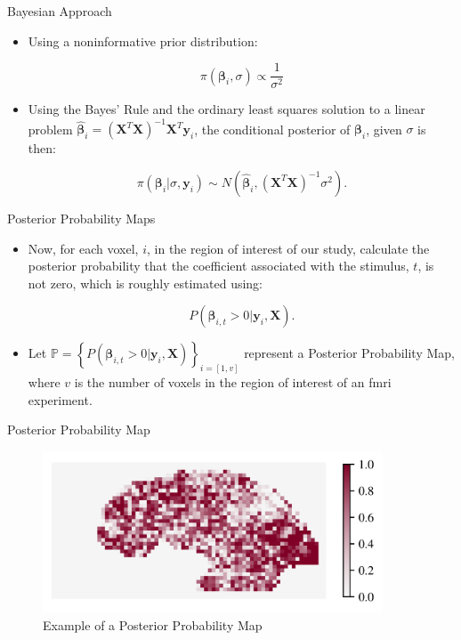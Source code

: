 \documentclass{beamer}
\begin{document}
\begin{frame}{Bayesian Approach}
\begin{itemize}
\item Using a noninformative prior distribution:

$$\pi \left( \bm{\beta}_i, \sigma \right) \propto \frac{1}{\sigma^{2}}$$

\item Using the Bayes' Rule and the ordinary least squares solution to a linear problem 
$\bm{\hat{\beta}}_i = \left( \bm{X}^T\bm{X} \right)^{-1}\bm{X}^T \bm{y}_i$, the 
conditional posterior of $\bm{\beta}_i$, given $\sigma$ is then:

$$\pi \left( \bm{\beta}_i|\sigma ,\bm{y}_i \right) \sim N\left( \bm{\hat{\beta}}_i, \left( \bm{X}^T\bm{X} \right)^{-1} \sigma^2 \right).$$
\end{itemize}
\end{frame}

\begin{frame}{Posterior Probability Maps}
\begin{itemize}
\item Now, for each voxel, $i$, in the region of interest of our study, 
calculate the posterior probability that the coefficient associated with 
the stimulus, $t$, is not zero, which is roughly estimated using: 

$$P(\bm{\beta}_{i,t} > 0 | \bm{y}_i, \bm{X}).$$

\item Let 
$\bm{\mathbb{P}} = \left\{ P(\bm{\beta}_{i,t} > 0 | \bm{y}_i, \bm{X}) \right\}_{i=[1,v]}$ 
represent a Posterior Probability Map, where $v$ is the number of voxels in 
the region of interest of an \gls{fmri} experiment.
\end{itemize}
\end{frame}

\begin{frame}{Posterior Probability Map}
\begin{figure}
\centering
\includegraphics[width=0.9\textwidth]{Images/pMapEx.png}
\caption{Example of a Posterior Probability Map}
\end{figure}
\end{frame}
\end{document}
